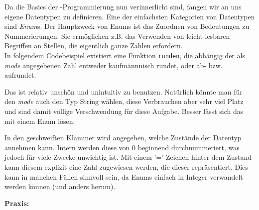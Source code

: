 
Da die Basics der \Cpp-Programmierung nun verinnerlicht sind, fangen wir an uns eigene Datentypen zu definieren.
Eine der einfachsten Kategorien von Datentypen sind \emph{Enum}s. Der Hauptzweck von Enums ist das Zuordnen von Bedeutungen zu Nummerierungen.
Sie ermöglichen z.B. das Verwenden von leicht lesbaren Begriffen an Stellen, die eigentlich ganze Zahlen erfordern. \\
In folgendem Codebeispiel existiert eine Funktion \texttt{runden}, die abhängig der als \emph{mode} angegebenen Zahl entweder kaufmännnisch rundet, oder ab- bzw. aufrundet.


Das ist relativ unschön und unintuitiv zu benutzen. Natürlich könnte man für den \emph{mode} auch den Typ String wählen,
diese Verbrauchen aber sehr viel Platz und sind damit völlige Verschwendung für diese Aufgabe.
Besser lässt sich das mit einem Enum lösen:


In den geschweiften Klammer wird angegeben, welche Zustände der Datentyp annehmen kann.
Intern werden diese von 0 beginnend durchnummeriert, was jedoch für viele Zwecke unwichtig ist.
Mit einem '='-Zeichen hinter dem Zustand kann diesem explizit eine Zahl zugewiesen werden, die dieser repräsentiert.
Dies kann in manchen Fällen sinnvoll sein, da Enums einfach in Integer verwandelt werden können (und anders herum).

\textbf{Praxis:}
